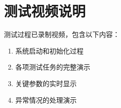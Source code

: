 \documentclass[UTF8]{ctexart}
\begin{document}
\section{测试视频说明}

测试过程已录制视频，包含以下内容：

\begin{enumerate}
    \item 系统启动和初始化过程
    \item 各项测试任务的完整演示
    \item 关键参数的实时显示
    \item 异常情况的处理演示
\end{enumerate}
\end{document}
